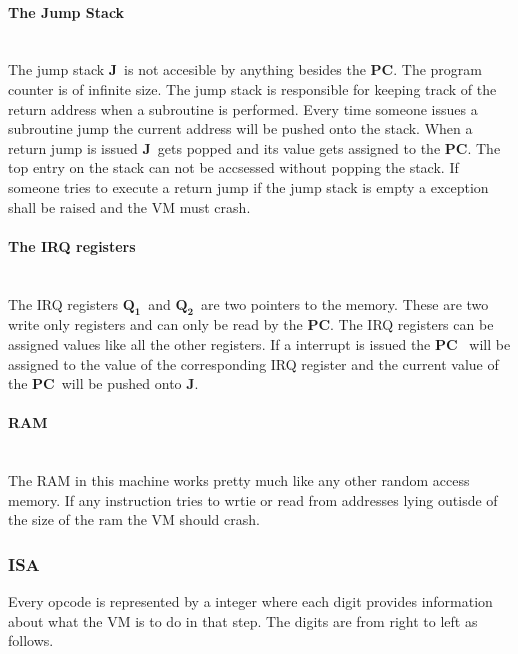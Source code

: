 \documentclass{article}
\newcommand{\q}{$\textbf{Q}_{\textbf{1}}$}
\newcommand{\qq}{$\textbf{Q}_{\textbf{2}}$}
\newcommand{\pc}{$\textbf{PC}$}
\newcommand{\J}{$\textbf{J}$}
\begin{document}
\paragraph{The Jump Stack} \
\\
The jump stack \J \ is not accesible by anything besides the \pc. The program
counter is of infinite size. The jump stack is responsible for keeping track
of the return address when a subroutine is performed. Every time someone
issues a subroutine jump the current address will be pushed onto the stack.
When a return jump is issued \J \ gets popped and its value gets assigned to
the \pc. The top entry on the stack can not be accsessed without popping the
stack.
If someone tries to execute a return jump if the jump stack is empty a exception 
shall be raised and the VM must crash.

\paragraph{The IRQ registers} \
\\
The IRQ registers \q \ and \qq \ are two pointers to the memory. These are two
write only registers and can only be read by the \pc. The IRQ registers can be
assigned values like all the other registers.  If a interrupt is issued the \pc
\ will be assigned to the value of the corresponding IRQ register and the current
value of the \pc \ will be pushed onto \J.

\paragraph{RAM} \
\\
The RAM in this machine works pretty much like any other random access
memory. If any instruction tries to wrtie or read from addresses lying outisde
of the size of the ram the VM should crash.

\subsubsection{ISA}
Every opcode is represented by a integer where each digit provides
information about what the VM is to do in that step. The digits are from right
to left as follows.
\end{document}
